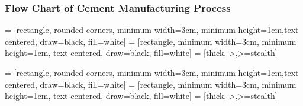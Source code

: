 \documentclass[a4paper,11pt]{book}
\begin{document}
\subsubsection{Flow Chart of Cement Manufacturing Process}

 = [rectangle, rounded corners, minimum width=3cm, minimum height=1cm,text centered, draw=black, fill=white]
 = [rectangle, minimum width=3cm, minimum height=1cm, text centered, draw=black, fill=white]
 = [thick,->,>=stealth]



 = [rectangle, rounded corners, minimum width=3cm, minimum height=1cm,text centered, draw=black, fill=white]
 = [rectangle, minimum width=3cm, minimum height=1cm, text centered, draw=black, fill=white]
 = [thick,->,>=stealth]
\end{document}
